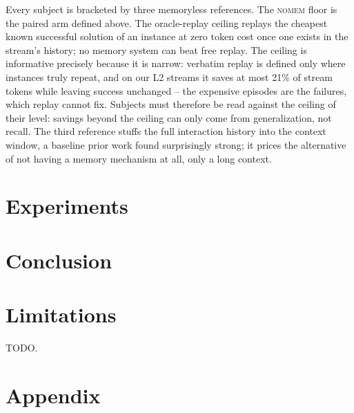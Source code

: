 \documentclass[11pt]{article}
\begin{document}
Every subject is bracketed by three memoryless references. The
\textsc{nomem} floor is the paired arm defined above. The oracle-replay
ceiling replays the cheapest known successful solution of an instance at
zero token cost once one exists in the stream's history; no memory system
can beat free replay. The ceiling is informative precisely because it is
narrow: verbatim replay is defined only where instances truly repeat, and on
our L2 streams it saves at most 21\% of stream tokens while leaving success
unchanged -- the expensive episodes are the failures, which replay cannot
fix. Subjects must therefore be read against the ceiling of their level: savings
beyond the ceiling can only come from generalization, not recall.
The third reference stuffs the full interaction history into the context
window, a baseline prior work found surprisingly strong; it prices the
alternative of not having a memory mechanism at all, only a long context.

\section{Experiments}

\section{Conclusion}

\section*{Limitations}
TODO.



\appendix

\section{Appendix}
\end{document}
